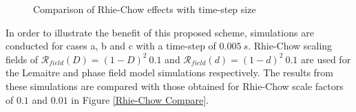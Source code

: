 \documentclass[sn-mathphys,Numbered,draft]{sn-jnl}%
\begin{document}
\begin{figure}[t!]
	\centering
		\qquad
				\qquad
	
	\caption{Comparison of Rhie-Chow effects with time-step size}
	\label{label_for_entire_figure}
\end{figure}



In order to illustrate the benefit of this proposed scheme, simulations are conducted for cases a, b and c with a time-step of $0.005\ s$. Rhie-Chow scaling fields of $\mathcal{R}_{field}(D)=(1-D)^2\ 0.1$ and $\mathcal{R}_{field}(d)=(1-d)^2\ 0.1$ are used for the Lemaitre and phase field model simulations respectively. The results from these simulations are compared with those obtained for Rhie-Chow scale factors of $0.1$ and $0.01$ in Figure \ref{Rhie-Chow Compare}.
\end{document}
